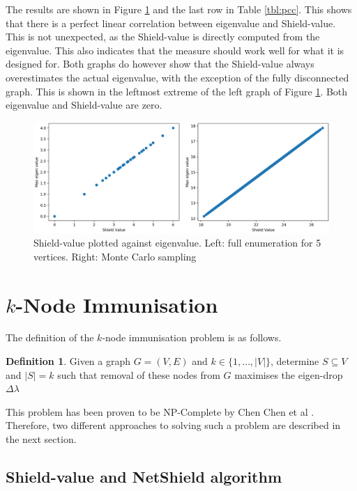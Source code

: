 \documentclass[11pt]{article}
\theoremstyle{definition}
\newtheorem{definition}{Definition}
\begin{document}
The results are shown in Figure \ref{fig:measure_sv} and the last row in Table \ref{tbl:pcc}. This shows that there is a perfect linear correlation between eigenvalue and Shield-value. This is not unexpected, as the Shield-value is directly computed from the eigenvalue. This also indicates that the measure should work well for what it is designed for. Both graphs do however show that the Shield-value always overestimates the actual eigenvalue, with the exception of the fully disconnected graph. This is shown in the leftmost extreme of the left graph of Figure \ref{fig:measure_sv}. Both eigenvalue and Shield-value are zero.


\begin{figure}[h!]
  \centering
    \includegraphics[width=1\textwidth]{results_graph_measures/Shield_Value_c}

  \caption{Shield-value plotted against eigenvalue. Left: full enumeration for 5 vertices. Right: Monte Carlo sampling}
  \label{fig:measure_sv}
\end{figure}

\cleardoublepage

\section{$k$-Node Immunisation}

The definition of the $k$-node immunisation problem is as follows.

\begin{definition}
Given a graph $G=(V,E)$ and $k \in\{1,\dots,|V|\}$, determine $S \subseteq V$ and $|S| = k$ such that removal of these nodes from $G$ maximises the eigen-drop $\Delta\lambda$
\end{definition}

This problem has been proven to be NP-Complete by Chen Chen et al \cite{chen2016node}. Therefore, two different approaches to solving such a problem are described in the next section. 

\subsection{Shield-value and NetShield algorithm}
\end{document}
